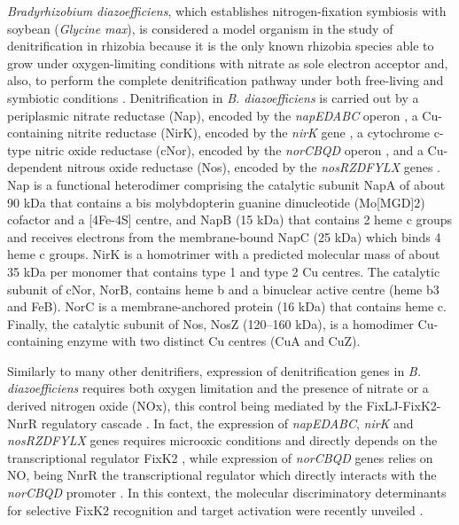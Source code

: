 \documentclass[12pt]{article}
\begin{document}
{\em Bradyrhizobium diazoefficiens}, which establishes nitrogen-fixation symbiosis with soybean
({\em Glycine max}), is considered a model organism in the study of denitrification in
rhizobia because it is the only known rhizobia species able to grow under oxygen-limiting
conditions with nitrate as sole electron acceptor and, also, to perform the complete denitrification
pathway under both free-living and symbiotic conditions \cite{bedmar2005complete}. Denitrification
in {\em B. diazoefficiens} is carried out by a periplasmic nitrate reductase (Nap), encoded by the
{\em napEDABC} operon \cite{delgado2003bradyrhizobium}, a Cu-containing nitrite reductase (NirK), encoded by the {\em nirK}
gene \cite{velasco2001characterization}, a cytochrome c-type nitric oxide reductase (cNor), encoded by the {\em norCBQD}
operon \cite{mesa2002characterization}, and a Cu-dependent nitrous oxide reductase (Nos), encoded by the {\em nosRZDFYLX}
genes \cite{velasco2004molecular}. Nap is a functional heterodimer comprising the catalytic subunit NapA of
about 90 kDa that contains a bis molybdopterin guanine dinucleotide (Mo[MGD]2) cofactor
and a [4Fe-4S] centre, and NapB (15 kDa) that contains 2 heme c groups and receives
electrons from the membrane-bound NapC (25 kDa) which binds 4 heme c groups. NirK
is a homotrimer with a predicted molecular mass of about 35 kDa per monomer that
contains type 1 and type 2 Cu centres. The catalytic subunit of cNor, NorB, contains heme b
and a binuclear active centre (heme b3 and FeB). NorC is a membrane-anchored protein
(16 kDa) that contains heme c. Finally, the catalytic subunit of Nos, NosZ (120–160 kDa), is
a homodimer Cu-containing enzyme with two distinct Cu centres (CuA and CuZ).

Similarly to many other denitrifiers, expression of denitrification genes in {\em B. diazoefficiens}
requires both oxygen limitation and the presence of nitrate or a derived nitrogen oxide
(NOx), this control being mediated by the FixLJ-FixK2-NnrR regulatory cascade \cite{mesa2003bradyrhizobium}\cite{mesa2008comprehensive}\cite{bueno2017disparate}.
In fact, the expression of {\em napEDABC}, {\em nirK} and {\em nosRZDFYLX} genes requires microoxic
conditions and directly depends on the transcriptional regulator FixK2 \cite{bueno2017disparate}\cite{torres2017fixk2}, while expression
of {\em norCBQD} genes relies on NO, being NnrR the transcriptional regulator which
directly interacts with the {\em norCBQD} promoter \cite{bueno2017disparate}\cite{jimenez2019expanding}. In this context, the molecular discriminatory
determinants for selective FixK2 recognition and target activation were recently unveiled \cite{cabrera2021dissection}.
\end{document}

